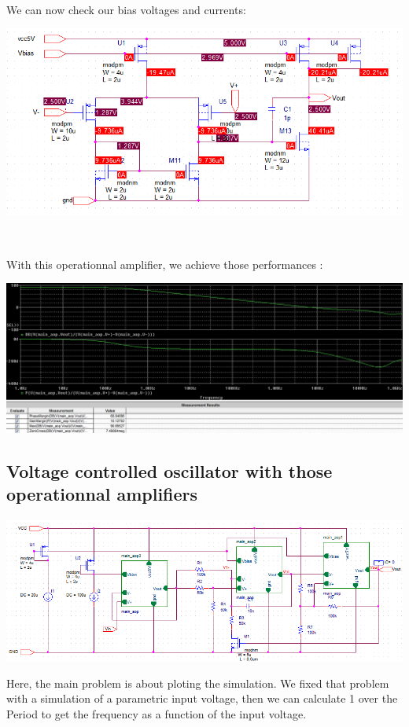 \documentclass{article}
\begin{document}
~

We can now check our bias voltages and currents:

\includegraphics[width=15cm]{bias_AOP.png}

~

With this operationnal amplifier, we achieve those performances :

\includegraphics[width=15cm]{bode_aop.png}

\subsection{Voltage controlled oscillator with those operationnal amplifiers}

\includegraphics[width=15cm]{VCO_schema.png}

Here, the main problem is about ploting the simulation. We fixed that problem with a simulation of a parametric input voltage, then we can calculate 1 over the Period to get the frequency as a function of the input voltage.
\end{document}
